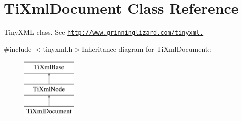 \hypertarget{class_ti_xml_document}{
\section{TiXmlDocument Class Reference}
\label{class_ti_xml_document}
}


TinyXML class. See \href{http://www.grinninglizard.com/tinyxml.}{\tt http://www.grinninglizard.com/tinyxml.}  


{\ttfamily \#include $<$tinyxml.h$>$}Inheritance diagram for TiXmlDocument::\begin{figure}[H]
\begin{center}
\leavevmode
\includegraphics[height=3cm]{class_ti_xml_document}
\end{center}
\end{figure}
